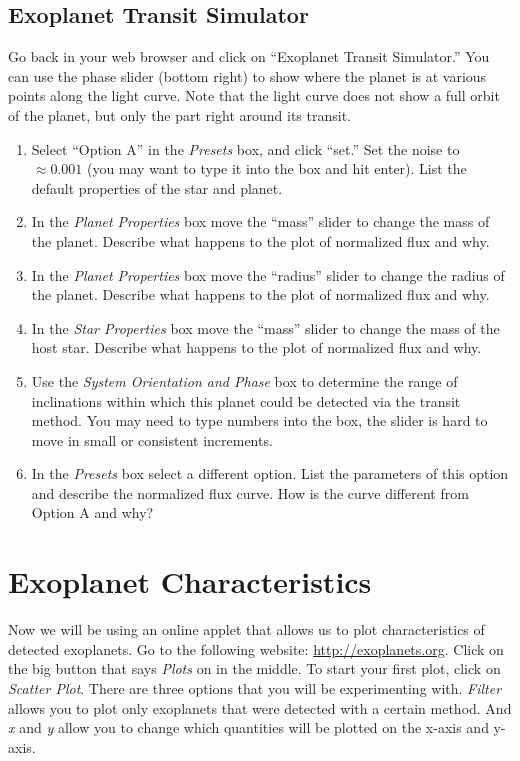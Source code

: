 \documentclass[12pt]{article}%
\begin{document}
\subsection{Exoplanet Transit Simulator}

Go back in your web browser and click on ``Exoplanet Transit Simulator.'' 
You can use the phase slider (bottom right) to show where the planet is at various points along the light curve.  
Note that the light curve does not show a full orbit of the planet, but only the part right around its transit.

\begin{enumerate}
\item Select ``Option A'' in the \textit{Presets} box, and click ``set.''  Set the noise to $\approx 0.001$ (you may want to type it into the box and hit enter).  
List the default properties of the star and planet. 
\item In the \textit{Planet Properties} box move the ``mass'' slider to change the mass of the planet. Describe what happens to the plot of normalized flux and why.
\item In the \textit{Planet Properties} box move the ``radius'' slider to change the radius of the planet. Describe what happens to the plot of normalized flux and why.
\item In the \textit{Star Properties} box move the ``mass'' slider to change the mass of the host star. Describe what happens to the plot of normalized flux and why.
\item Use the \textit{System Orientation and Phase} box to determine the range of inclinations within which this planet could be detected via the transit method.  
You may need to type numbers into the box, the slider is hard to move in small or consistent increments.
\item In the \textit{Presets} box select a different option.  
List the parameters of this option and describe the normalized flux curve.  
How is the curve different from Option A and why?
\end{enumerate}


\section{Exoplanet Characteristics}

Now we will be using an online applet that allows us to plot characteristics of detected exoplanets. Go to the following website: \url{http://exoplanets.org}.  
Click on the big button that says \textit{Plots} on in the middle.  
To start your first plot, click on \textit{Scatter Plot}. There are three options that you will be experimenting with.  
\textit{Filter} allows you to plot only exoplanets that were detected with a certain method.  
And \textit{x} and \textit{y} allow you to change which quantities will be plotted on the x-axis and y-axis.
\end{document}
